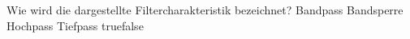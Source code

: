     {Wie wird die dargestellte Filtercharakteristik bezeichnet?}
    {Bandpass}
    {Bandsperre}
    {Hochpass}
    {Tiefpass}
    {true}{false}